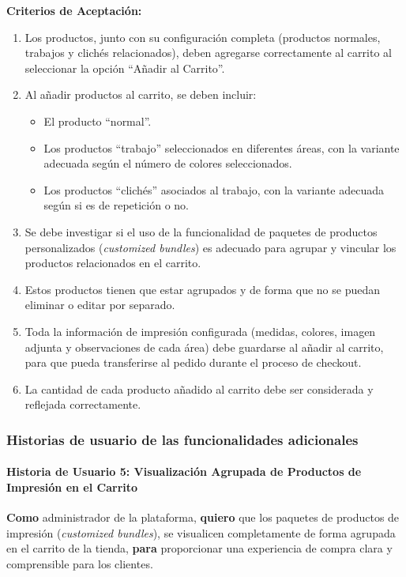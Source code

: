 \documentclass[11pt]{article}
\newcommand{\subsubsubsection}[1]{\paragraph{#1}}
\begin{document}
\vspace{0.5cm}
\textbf{Criterios de Aceptación:}
\begin{enumerate}[label=\arabic*.]
    \item Los productos, junto con su configuración completa (productos normales, trabajos y clichés relacionados), deben agregarse correctamente al carrito al seleccionar la opción ``Añadir al Carrito''.
    \item Al añadir productos al carrito, se deben incluir:
          \begin{itemize}
              \item El producto ``normal''.
              \item Los productos ``trabajo'' seleccionados en diferentes áreas, con la variante adecuada según el número de colores seleccionados.
              \item Los productos ``clichés'' asociados al trabajo, con la variante adecuada según si es de repetición o no.
          \end{itemize}
    \item Se debe investigar si el uso de la funcionalidad de paquetes de productos personalizados (\textit{customized bundles}) es adecuado para agrupar y vincular los productos relacionados en el carrito.
    \item Estos productos tienen que estar agrupados y de forma que no se puedan eliminar o editar por separado.
    \item Toda la información de impresión configurada (medidas, colores, imagen adjunta y observaciones de cada área) debe guardarse al añadir al carrito, para que pueda transferirse al pedido durante el proceso de checkout.
    \item La cantidad de cada producto añadido al carrito debe ser considerada y reflejada correctamente.
\end{enumerate}

\subsubsection{Historias de usuario de las funcionalidades adicionales}

\subsubsubsection{Historia de Usuario 5: Visualización Agrupada de Productos de Impresión en el Carrito}\label{sec:historia5}

\textbf{Como} administrador de la plataforma,
\textbf{quiero} que los paquetes de productos de impresión (\textit{customized bundles}), se visualicen completamente de forma agrupada en el carrito de la tienda,
\textbf{para} proporcionar una experiencia de compra clara y comprensible para los clientes.
\end{document}
